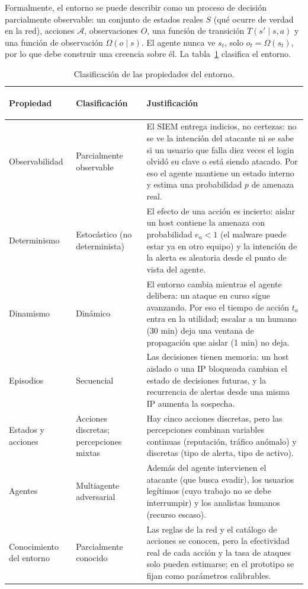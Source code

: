\documentclass[11pt,a4paper]{article}
\begin{document}
Formalmente, el entorno se puede describir como un proceso de decisión parcialmente observable: un conjunto de estados reales $S$ (qué ocurre de verdad en la red), acciones $\mathcal{A}$, observaciones $O$, una función de transición $T(s'\mid s,a)$ y una función de observación $\Omega(o\mid s)$. El agente nunca ve $s_t$, solo $o_t=\Omega(s_t)$, por lo que debe construir una creencia sobre él. La tabla~\ref{tab:entorno} clasifica el entorno.

\begin{table}[!t]
\centering
\caption{Clasificación de las propiedades del entorno.}\label{tab:entorno}
\small
\begin{tabularx}{\textwidth}{>{\bfseries\raggedright\arraybackslash}p{3.0cm}>{\raggedright\arraybackslash}p{3.2cm}X}
\toprule
\textnormal{Propiedad} & Clasificación & Justificación \\
\midrule
Observabilidad & Parcialmente observable &
El SIEM entrega indicios, no certezas: no se ve la intención del atacante ni se sabe si un usuario que falla diez veces el login olvidó su clave o está siendo atacado. Por eso el agente mantiene un estado interno y estima una probabilidad $p$ de amenaza real. \\
Determinismo & Estocástico (no determinista) &
El efecto de una acción es incierto: aislar un host contiene la amenaza con probabilidad $e_a<1$ (el malware puede estar ya en otro equipo) y la intención de la alerta es aleatoria desde el punto de vista del agente. \\
Dinamismo & Dinámico &
El entorno cambia mientras el agente delibera: un ataque en curso sigue avanzando. Por eso el tiempo de acción $t_a$ entra en la utilidad; escalar a un humano (30 min) deja una ventana de propagación que aislar (1 min) no deja. \\
Episodios & Secuencial &
Las decisiones tienen memoria: un host aislado o una IP bloqueada cambian el estado de decisiones futuras, y la recurrencia de alertas desde una misma IP aumenta la sospecha. \\
Estados y acciones & Acciones discretas; percepciones mixtas &
Hay cinco acciones discretas, pero las percepciones combinan variables continuas (reputación, tráfico anómalo) y discretas (tipo de alerta, tipo de activo). \\
Agentes & Multiagente adversarial &
Además del agente intervienen el atacante (que busca evadir), los usuarios legítimos (cuyo trabajo no se debe interrumpir) y los analistas humanos (recurso escaso). \\
Conocimiento del entorno & Parcialmente conocido &
Las reglas de la red y el catálogo de acciones se conocen, pero la efectividad real de cada acción y la tasa de ataques solo pueden estimarse; en el prototipo se fijan como parámetros calibrables. \\
\bottomrule
\end{tabularx}
\end{table}
\end{document}
